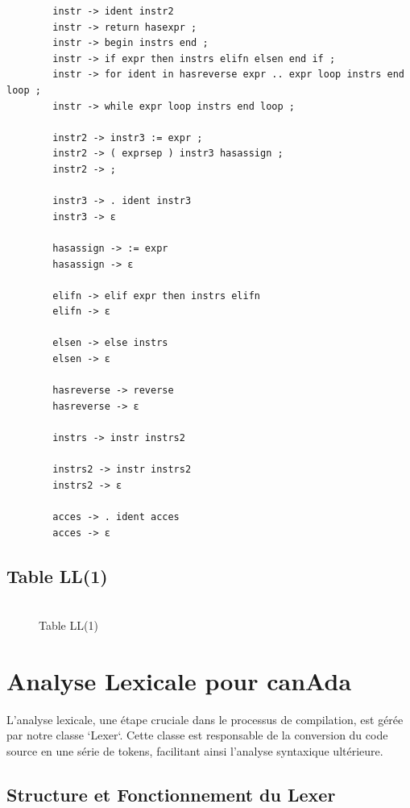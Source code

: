 \documentclass[french,a4paper]{article}
\begin{document}
\begin{verbatim}
        instr -> ident instr2
        instr -> return hasexpr ;
        instr -> begin instrs end ;
        instr -> if expr then instrs elifn elsen end if ;
        instr -> for ident in hasreverse expr .. expr loop instrs end loop ;
        instr -> while expr loop instrs end loop ;

        instr2 -> instr3 := expr ;
        instr2 -> ( exprsep ) instr3 hasassign ;
        instr2 -> ;

        instr3 -> . ident instr3
        instr3 -> ε

        hasassign -> := expr
        hasassign -> ε

        elifn -> elif expr then instrs elifn
        elifn -> ε

        elsen -> else instrs
        elsen -> ε

        hasreverse -> reverse
        hasreverse -> ε

        instrs -> instr instrs2

        instrs2 -> instr instrs2
        instrs2 -> ε

        acces -> . ident acces
        acces -> ε
    \end{verbatim}

    \subsection{Table LL(1)}\label{subsec:table-ll(1)}

    \begin{figure}[H]
        \centering
        \includegraphics[width=0.8,angle=90]{tableau_parsing}
        \caption{Table LL(1)}
    \end{figure}

    \section{Analyse Lexicale pour canAda}

    L'analyse lexicale, une étape cruciale dans le processus de compilation, est gérée par notre classe `Lexer`. Cette classe est responsable de la conversion du code source en une série de tokens, facilitant ainsi l'analyse syntaxique ultérieure.

    \subsection{Structure et Fonctionnement du Lexer}
\end{document}
